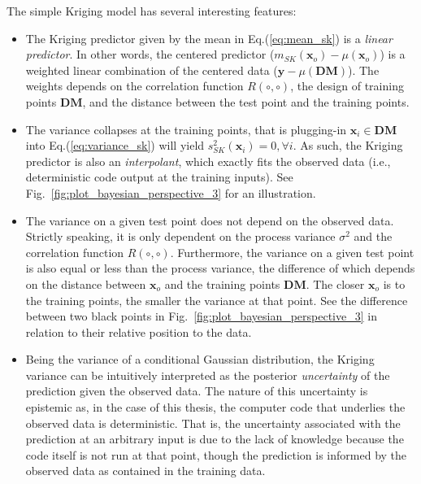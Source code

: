The simple Kriging model has several interesting features:
\begin{itemize}

	\item The Kriging predictor given by the mean in Eq.(\ref{eq:mean_sk}) is a \emph{linear predictor}. 
	      In other words, the centered predictor ($m_{SK}(\bm{x}_o) - \mu (\bm{x}_o)$)  is a weighted linear combination of the centered data 
	      ($\mathbf{y} - \mu(\mathbf{DM})$).
				The weights depends on the correlation function $R(\circ,\circ)$, the design of training points $\mathbf{DM}$, and the distance between the test point and the training points.

	\item The variance collapses at the training points, that is plugging-in $\mathbf{x}_i \in \mathbf{DM}$ into Eq.(\ref{eq:variance_sk}) will yield $s^2_{SK}(\mathbf{x}_i) = 0, \forall i$.
	      As such, the Kriging predictor is also an \emph{interpolant}, which exactly fits the observed data (i.e., deterministic code output at the training inputs).
				See Fig.~\ref{fig:plot_bayesian_perspective_3} for an illustration.

	\item The variance on a given test point does not depend on the observed data.
	      Strictly speaking, it is only dependent on the process variance $\sigma^2$ and the correlation function $R(\circ,\circ)$.
				Furthermore, the variance on a given test point is also equal or less than the process variance, 
				the difference of which depends on the distance between $\bm{x}_o$ and the training points $\mathbf{DM}$.
				The closer $\bm{x}_o$ is to the training points, the smaller the variance at that point.
				See the difference between two black points in Fig.~\ref{fig:plot_bayesian_perspective_3} in relation to their relative position to the data.

	\item Being the variance of a conditional Gaussian distribution, the Kriging variance can be intuitively interpreted as the posterior \emph{uncertainty} of the prediction given the observed data.
	      The nature of this uncertainty is epistemic as, in the case of this thesis, the computer code that underlies the observed data is deterministic.
				That is, the uncertainty associated with the prediction at an arbitrary input is due to the lack of knowledge because the code itself is not run at that point,
				though the prediction is informed by the observed data as contained in the training data.
\end{itemize}

